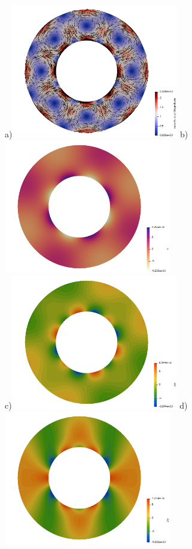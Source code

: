 \newpage
\begin{center}
a)\includegraphics[width=7.3cm]{python_codes/fieldstone_21/results/vel}
b)\includegraphics[width=7.3cm]{python_codes/fieldstone_21/results/q}\\
c)\includegraphics[width=7.3cm]{python_codes/fieldstone_21/results/Lxx}
d)\includegraphics[width=7.3cm]{python_codes/fieldstone_21/results/Lxy}\\

\end{center}
